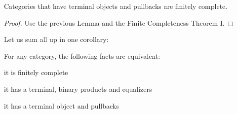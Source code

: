 \begin{proposition}
Categories that have terminal objects and pullbacks are finitely complete.
\end{proposition}

\begin{proof}
Use the previous Lemma and the Finite Completeness Theorem I.
\end{proof}

Let us sum all up in one corollary:

\begin{corollary}
For any category, the following facts are equivalent:
\begin{tcbenum}
\item it is finitely complete
\item it has a terminal, binary products and equalizers
\item it has a terminal object and pullbacks
\end{tcbenum}
\end{corollary}

